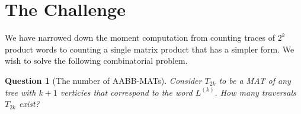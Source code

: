 \documentclass{article}
\newtheorem{question}{Question}
\begin{document}
\section{The Challenge}
We have narrowed down the moment computation from counting traces of $2^k$ product words 
to counting a single matrix product that has a simpler form. We wish to 
solve the following combinatorial problem. 

\begin{question}[The number of AABB-MATs]
    Consider $T_{2k}$ to be a MAT of any tree with $k + 1$ 
    verticies that correspond to the word $L^{(k)}$. How many traversals 
    $T_{2k}$ exist? 
\end{question}
\end{document}
